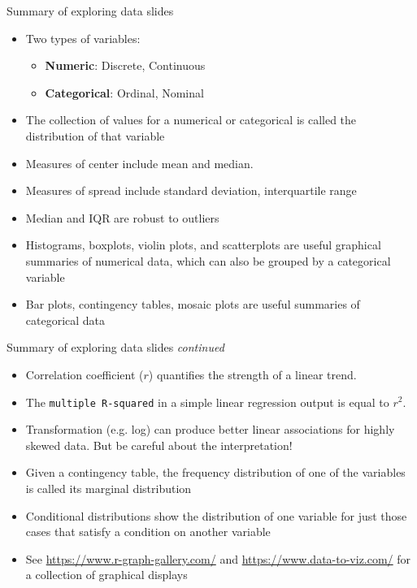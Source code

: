 \documentclass[10pt,handout]{beamer}\usepackage[]{graphicx}\usepackage[]{color}
\begin{document}
\begin{frame}{Summary of exploring data slides} 
	
\begin{itemize}
	\item Two types of variables:
	\begin{itemize}
		\item \textbf{Numeric}: Discrete, Continuous
		\item \textbf{Categorical}: Ordinal, Nominal
	\end{itemize}
\pause
\item The collection of values for a numerical or categorical is called the distribution of that variable
\pause
\item Measures of center include mean and median. 
\item Measures of spread include standard deviation, interquartile range
\item Median and IQR are robust to outliers
\pause
\item Histograms, boxplots, violin plots, and scatterplots are useful graphical summaries of numerical data, which can also be grouped by a categorical variable
\item Bar plots, contingency tables, mosaic plots are useful summaries of categorical data
\end{itemize}
\end{frame}

\begin{frame}{Summary of exploring data slides \textit{continued}} 
	
	\begin{itemize}
		\item Correlation coefficient ($r$) quantifies the strength of a linear trend. 
		\item The \texttt{multiple R-squared} in a simple linear regression output is equal to $r^2$. 
		\item Transformation (e.g. log) can produce better linear associations for highly skewed data. But be careful about the interpretation!
		\pause
		\item Given a contingency table, the frequency distribution of one of the variables is called its marginal distribution
		\item Conditional distributions show the distribution of one variable for just those cases that satisfy a condition on another variable
		\item See \url{https://www.r-graph-gallery.com/} and \url{https://www.data-to-viz.com/} for a collection of graphical displays
	\end{itemize}
\end{frame}
\end{document}
